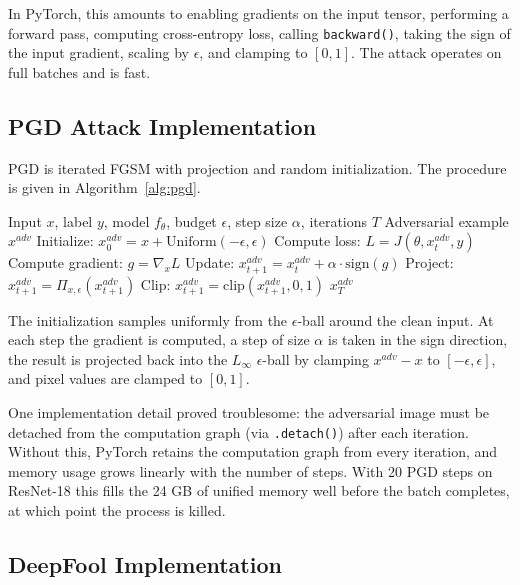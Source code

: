 In PyTorch, this amounts to enabling gradients on the input tensor, performing a forward pass, computing cross-entropy loss, calling \texttt{backward()}, taking the sign of the input gradient, scaling by $\epsilon$, and clamping to $[0, 1]$. The attack operates on full batches and is fast.

\subsection{PGD Attack Implementation}

PGD is iterated FGSM with projection and random initialization. The procedure is given in Algorithm~\ref{alg:pgd}.

\begin{algorithm}[htbp]
\caption{Projected Gradient Descent (PGD) Attack}
\label{alg:pgd}
\begin{algorithmic}[1]
\REQUIRE Input $x$, label $y$, model $f_\theta$, budget $\epsilon$, step size $\alpha$, iterations $T$
\ENSURE Adversarial example $x^{adv}$
\STATE Initialize: $x^{adv}_0 = x + \text{Uniform}(-\epsilon, \epsilon)$ 
    \STATE Compute loss: $L = J(\theta, x^{adv}_t, y)$
    \STATE Compute gradient: $g = \nabla_x L$
    \STATE Update: $x^{adv}_{t+1} = x^{adv}_t + \alpha \cdot \text{sign}(g)$
    \STATE Project: $x^{adv}_{t+1} = \Pi_{x,\epsilon}(x^{adv}_{t+1})$ 
    \STATE Clip: $x^{adv}_{t+1} = \text{clip}(x^{adv}_{t+1}, 0, 1)$
\ENDFOR
\RETURN $x^{adv}_T$
\end{algorithmic}
\end{algorithm}

The initialization samples uniformly from the $\epsilon$-ball around the clean input. At each step the gradient is computed, a step of size $\alpha$ is taken in the sign direction, the result is projected back into the $L_\infty$ $\epsilon$-ball by clamping $x^{adv} - x$ to $[-\epsilon, \epsilon]$, and pixel values are clamped to $[0, 1]$.

One implementation detail proved troublesome: the adversarial image must be detached from the computation graph (via \texttt{.detach()}) after each iteration. Without this, PyTorch retains the computation graph from every iteration, and memory usage grows linearly with the number of steps. With 20 PGD steps on ResNet-18 this fills the 24 GB of unified memory well before the batch completes, at which point the process is killed.

\subsection{DeepFool Implementation}

